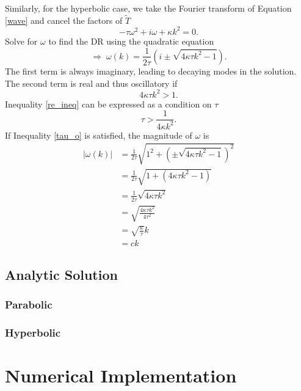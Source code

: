 \documentclass[iop]{emulateapj}
\begin{document}
				Similarly, for the hyperbolic case, we take the Fourier transform of Equation \ref{wave} and cancel the factors of $\tilde{T}$
				\begin{equation}
					- \tau \omega^2 + i \omega + \kappa k^2 = 0.
				\end{equation}
				Solve for $\omega$ to find the \ac{DR} using the quadratic equation
				\begin{equation}
					\Rightarrow \; \omega(k) = \frac{1}{2 \tau} \left( i \pm \sqrt{4 \kappa \tau k^2 - 1} \right).
				\end{equation}
				The first term is always imaginary, leading to decaying modes in the solution.
				The second term is real and thus oscillatory if 
				\begin{equation} \label{re_ineq}
					 4 \kappa \tau k^2 > 1.
				\end{equation}
				Inequality \ref{re_ineq} can be expressed as a condition on $\tau$
				\begin{equation} \label{tau_o}
					\tau > \frac{1}{4 \kappa k^2}.
				\end{equation}			
				If Inequality \ref{tau_o} is satisfied, the magnitude of $\omega$ is
				\begin{align}
					|\omega(k)| &= \frac{1}{2 \tau} \sqrt{ 1^2 +  \left(\pm \sqrt{4 \kappa \tau k^2 - 1}\right)^2 } \\
								&= \frac{1}{2 \tau} \sqrt{1 + (4 \kappa \tau k^2 - 1)} \\
								&= \frac{1}{2 \tau} \sqrt{4 \kappa \tau k^2} \\
								&= \sqrt{\frac{4 \kappa \tau k^2}{4 \tau^2}} \\
								&= \sqrt{\frac{\kappa}{\tau}} k \\
								&= c k
				\end{align}

			
		\subsection{Analytic Solution}
			\subsubsection{Parabolic}
			\subsubsection{Hyperbolic}
	\section{Numerical Implementation}
\end{document}
